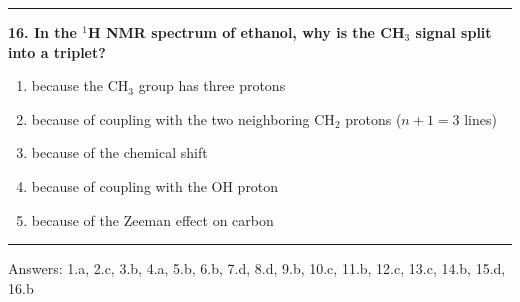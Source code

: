 \documentclass[
  english,
  9pt,
]{extbook}
\providecommand{\tightlist}{%
  \setlength{\itemsep}{0pt}\setlength{\parskip}{0pt}}
\theoremstyle{definition}
\theoremstyle{definition}
\theoremstyle{definition}
\theoremstyle{definition}
\theoremstyle{remark}
\begin{document}
\begin{center}\rule{0.5\linewidth}{0.5pt}\end{center}

\textbf{16. In the \(^1\)H NMR spectrum of ethanol, why is the CH\(_3\) signal split into a triplet?}

\begin{enumerate}
\def\labelenumi{\alph{enumi}.}
\tightlist
\item
  because the CH\(_3\) group has three protons\\
\item
  because of coupling with the two neighboring CH\(_2\) protons (\(n+1=3\) lines)\\
\item
  because of the chemical shift\\
\item
  because of coupling with the OH proton\\
\item
  because of the Zeeman effect on carbon
\end{enumerate}

\begin{center}\rule{0.5\linewidth}{0.5pt}\end{center}

Answers: 1.a, 2.c, 3.b, 4.a, 5.b, 6.b, 7.d, 8.d, 9.b, 10.c, 11.b, 12.c, 13.c, 14.b, 15.d, 16.b
\end{document}
